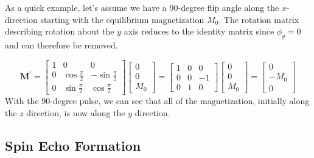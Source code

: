 \documentclass[11pt]{article}
\theoremstyle{definition}
\begin{document}
As a quick example, let's assume we have a 90-degree flip angle along the $x$-direction starting with the equilibrium magnetization $M_0$. The rotation matrix describing rotation about the $y$ axis reduces to the identity matrix since $\phi_y = 0$ and can therefore be removed.

\begin{equation}
    \mathbf{M}^\prime = 
    \begin{bmatrix}
        1 & 0 & 0\\
        0 & \cos \frac{\pi}{2} & -\sin \frac{\pi}{2} \\
        0 & \sin \frac{\pi}{2} & \cos \frac{\pi}{2}
    \end{bmatrix}
    \begin{bmatrix}
        0\\0\\M_0
    \end{bmatrix} = 
    \begin{bmatrix}
        1 & 0 & 0 \\
        0 & 0 & -1 \\
        0 & 1 & 0
    \end{bmatrix}
    \begin{bmatrix}
        0\\0\\M_0
    \end{bmatrix} = 
    \begin{bmatrix}
        0\\-M_0\\0
    \end{bmatrix}
\end{equation}
With the 90-degree pulse, we can see that all of the magnetization, initially along the $z$ direction, is now along the $y$ direction. 

\subsection{Spin Echo Formation}
\end{document}
